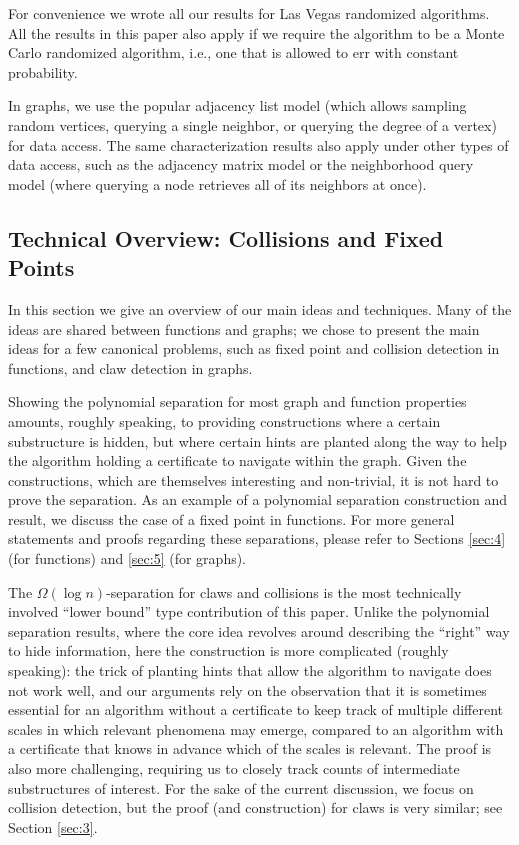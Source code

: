 \documentclass[11pt]{article}
\numberwithin{equation}{section}
\newcommand{\1}{\mathbf{1}}
\begin{document}
For convenience we wrote all our results for Las Vegas randomized algorithms. All the results in this paper also apply if we require the algorithm to be a Monte Carlo randomized algorithm, i.e., one that is allowed to err with constant probability.

In graphs, we use the popular adjacency list model (which allows sampling random vertices, querying a single neighbor, or querying the degree of a vertex) for data access. The same characterization results also apply under other types of data access, such as the adjacency matrix model or the neighborhood query model (where querying a node retrieves all of its neighbors at once).












\subsection{Technical Overview: Collisions and Fixed Points}

In this section we give an overview of our main ideas and techniques. Many of the ideas are shared between functions and graphs; we chose to present the main ideas for a few canonical problems, such as fixed point and collision detection in functions, and claw detection in graphs. 

Showing the polynomial separation for most graph and function properties amounts, roughly speaking, to providing constructions where a certain substructure is hidden, but where certain hints are planted along the way to help the algorithm holding a certificate to navigate within the graph. Given the constructions, which are themselves interesting and non-trivial, it is not hard to prove the separation. As an example of a polynomial separation construction and result, we discuss the case of a fixed point in functions. For more general statements and proofs regarding these separations, please refer to Sections \ref{sec:4} (for functions) and \ref{sec:5} (for graphs).

The $\Omega(\log n)$-separation for claws and collisions is the most technically involved ``lower bound'' type contribution of this paper. Unlike the polynomial separation results, where the core idea revolves around describing the ``right'' way to hide information, here the construction is more complicated (roughly speaking): the trick of planting hints that allow the algorithm to navigate does not work well, and our arguments rely on the observation that it is sometimes essential for an algorithm without a certificate to keep track of multiple different scales in which relevant phenomena may emerge, compared to an algorithm with a certificate that knows in advance which of the scales is relevant.
The proof is also more challenging, requiring us to closely track counts of intermediate substructures of interest. For the sake of the current discussion, we focus on collision detection, but the proof (and construction) for claws is very similar; see Section \ref{sec:3}.
\end{document}
